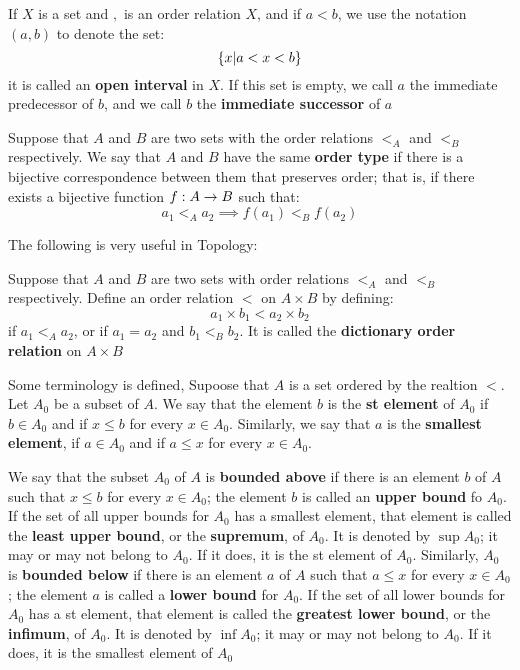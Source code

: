 \begin{defn}
	If $X$ is a set and $,$ is an order relation $X$, and if $a < b$, we use the notation $(a,b)$ to denote the set:
	\[ \left\lbrace x | a < x < b \right\rbrace \]
	it is called an \textbf{open interval } in $X$. If this set is empty, we call $a$ the immediate predecessor of $b$, and we call $b$ the \textbf{immediate successor} of $a$
\end{defn}

\begin{defn}
	Suppose that $A$ and $B$ are two sets with the order relations $ <_A $ and $ <_B $ respectively. We say that $A$ and $B$ have the same \textbf{order type} if there is a bijective correspondence between them that preserves order; that is, if there exists a bijective function $f : A \rightarrow B$ such that:
	\[ a_1 <_A a_2 \implies f(a_1) <_B f(a_2) \]
	
\end{defn}

The following is very useful in Topology:

\begin{defn}
	Suppose that $A$ and $B$ are two sets with order relations $ <_A $ and $ < _B $ respectively. Define an order relation $ <$ on $A \times B$ by defining:
	\[ a_1 \times b_1  < a_2 \times b_2 \]
	if $a_1 <_A a_2$, or if $a_1 = a_2 $ and $ b_1 <_B b_2$. It is called the \textbf{dictionary order relation} on $ A \times B$
\end{defn}

Some terminology is defined, Supoose that $A$ is a set ordered by the realtion $<$. Let $A_0$ be a subset of $A$. We say that the element $b$ is the \textbf{st element} of $A_0$ if $b \in A_0$ and if $ x \leq b$ for every $x \in A_0$. Similarly, we say that $a$ is the \textbf{smallest element}, if $a \in A_0$ and if $a \leq x$ for every $x \in A_0$.

We say that the subset $A_0$ of $A$ is \textbf{bounded above} if there is an element $b$ of $A$ such that $x \leq b$ for every $ x \in A_0$; the element $b$ is called an \textbf{upper bound } fo $A_0$. If the set of all upper bounds for $A_0$ has a smallest element, that element is called the \textbf{least upper bound}, or the \textbf{supremum}, of $A_0$. It is denoted by $ \sup A_0$; it may or may not belong to $A_0$. If it does, it is the st element of $A_0$.
	Similarly, $A_0$ is \textbf{bounded below} if there is an element $a$ of $A$ such that $ a \leq x$ for every $x \in A_0 $; the element $a$ is called a \textbf{lower bound} for $A_0$. If the set of all lower bounds for $A_0$ has a st element, that element is called the \textbf{greatest lower bound}, or the \textbf{infimum}, of $A_0$. It is denoted by $ \inf A_0$; it may or may not belong to $A_0$. If it does, it is the smallest element of $A_0$
	
